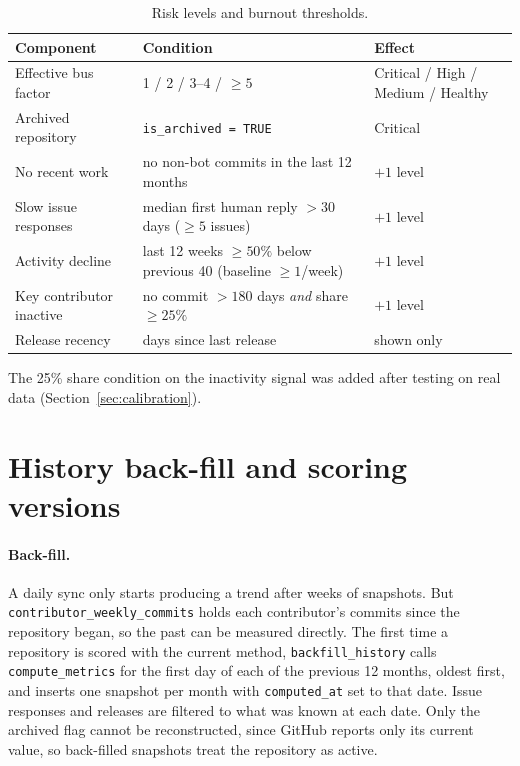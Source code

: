 \documentclass[11pt,a4paper]{report}
\begin{document}
\begin{table}[H]
\centering
\caption{Risk levels and burnout thresholds.}
\label{tab:thresholds}
\small
\begin{tabularx}{\textwidth}{l X l}
\toprule
\textbf{Component} & \textbf{Condition} & \textbf{Effect} \\
\midrule
Effective bus factor & 1 / 2 / 3--4 / $\ge 5$ & Critical / High / Medium / Healthy \\
Archived repository & \texttt{is\_archived = TRUE} & Critical \\
No recent work & no non-bot commits in the last 12 months & $+1$ level \\
Slow issue responses & median first human reply $> 30$ days ($\ge 5$ issues) & $+1$ level \\
Activity decline & last 12 weeks $\ge 50\%$ below previous 40 (baseline $\ge 1$/week) & $+1$ level \\
Key contributor inactive & no commit $> 180$ days \emph{and} share $\ge 25\%$ & $+1$ level \\
Release recency & days since last release & shown only \\
\bottomrule
\end{tabularx}
\end{table}

The 25\% share condition on the inactivity signal was added after testing on
real data (Section~\ref{sec:calibration}).

\section{History back-fill and scoring versions}
\label{sec:backfill}

\paragraph{Back-fill.} A daily sync only starts producing a trend after weeks
of snapshots. But \texttt{contributor\_weekly\_commits} holds each
contributor's commits since the repository began, so the past can be
measured directly. The first time a repository is scored with the current
method, \texttt{backfill\_history} calls \texttt{compute\_metrics} for the
first day of each of the previous 12 months, oldest first, and inserts one
snapshot per month with \texttt{computed\_at} set to that date. Issue
responses and releases are filtered to what was known at each date. Only the
archived flag cannot be reconstructed, since GitHub reports only its current
value, so back-filled snapshots treat the repository as active.
\end{document}
